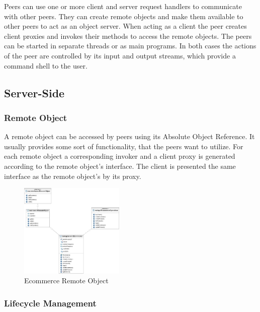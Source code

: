 Peers can use one or more client and server request handlers to communicate with other peers.
They can create remote objects and make them available to other peers to act as an object server.
When acting as a client the peer creates client proxies and invokes their methods to access the remote objects.
The peers can be started in separate threads or as main programs.
In both cases the actions of the peer are controlled by its input and output streams, which provide a command shell to the user.

\subsection{Server-Side}

\subsubsection{Remote Object}
A remote object can be accessed by peers using its Absolute Object Reference. It usually provides some sort of functionality, that the peers want to utilize. For each remote object a corresponding invoker and a client proxy is generated according to the remote object's interface. The client is presented the same interface as the remote object's by its proxy.

\begin{figure}[ht!]
	\centering\includegraphics[width=5cm]{uml/Ecommerce.jpg} 
	\caption{Ecommerce Remote Object}
	\label{fig:ecommerce}
\end{figure}

\subsubsection{Lifecycle Management}

